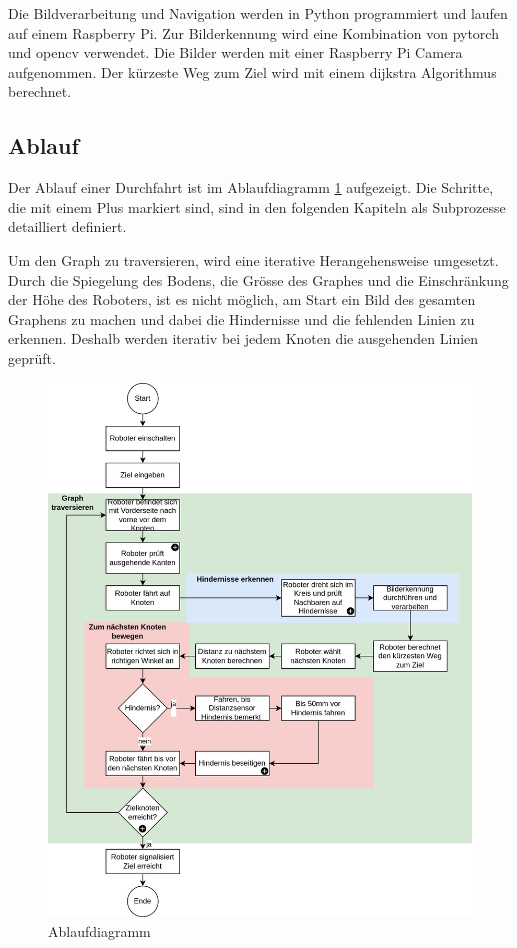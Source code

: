 Die Bildverarbeitung und Navigation werden in Python programmiert und laufen auf einem Raspberry Pi. Zur Bilderkennung wird eine Kombination von \gls{pytorch} und \gls{opencv} verwendet. Die Bilder werden mit einer Raspberry Pi Camera aufgenommen. Der kürzeste Weg zum Ziel wird mit einem \gls{dijkstra} Algorithmus berechnet.

\subsection{Ablauf}

Der Ablauf einer Durchfahrt ist im Ablaufdiagramm \ref{fig:ablaufdiagramm} aufgezeigt.
Die Schritte, die mit einem Plus markiert sind, sind in den folgenden Kapiteln als Subprozesse detailliert definiert.

Um den Graph zu traversieren, wird eine iterative Herangehensweise umgesetzt. Durch die Spiegelung des Bodens, die Grösse des Graphes und die Einschränkung der Höhe des Roboters, ist es nicht möglich, am Start ein Bild des gesamten Graphens zu machen und dabei die Hindernisse und die fehlenden Linien zu erkennen. Deshalb werden iterativ bei jedem Knoten die ausgehenden Linien geprüft.

\begin{figure}[H]
\centering
\includegraphics[width=\textwidth]{assets/gesamtkonzept/ablaufdiagramm.png}
\caption{Ablaufdiagramm}
\label{fig:ablaufdiagramm}
\end{figure}

